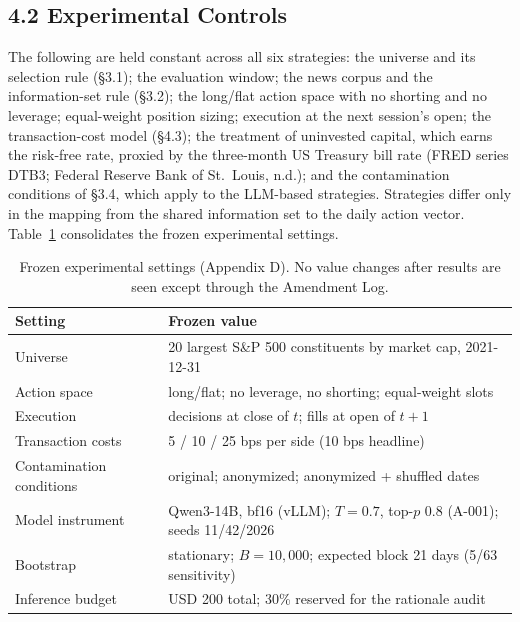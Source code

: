 \documentclass[
  12pt,
]{article}
\begin{document}
\hypertarget{experimental-controls}{%
\subsection{4.2 Experimental Controls}\label{experimental-controls}}

The following are held constant across all six strategies: the universe
and its selection rule (§3.1); the evaluation window; the news corpus
and the information-set rule (§3.2); the long/flat action space with no
shorting and no leverage; equal-weight position sizing; execution at the
next session's open; the transaction-cost model (§4.3); the treatment of
uninvested capital, which earns the risk-free rate, proxied by the
three-month US Treasury bill rate (FRED series DTB3; Federal Reserve
Bank of St.~Louis, n.d.); and the contamination conditions of §3.4,
which apply to the LLM-based strategies. Strategies differ only in the
mapping from the shared information set to the daily action vector. Table~\ref{tab:settings} consolidates the frozen experimental settings.

\begin{table}[H]
\centering\small
\caption{Frozen experimental settings (Appendix D). No value changes after
results are seen except through the Amendment Log.}
\label{tab:settings}
\begin{tabular}{ll}
\toprule
Setting & Frozen value \\
\midrule
Universe & 20 largest S\&P 500 constituents by market cap, 2021-12-31 \\
Action space & long/flat; no leverage, no shorting; equal-weight slots \\
Execution & decisions at close of $t$; fills at open of $t{+}1$ \\
Transaction costs & 5 / 10 / 25 bps per side (10 bps headline) \\
Contamination conditions & original; anonymized; anonymized + shuffled dates \\
Model instrument & Qwen3-14B, bf16 (vLLM); $T{=}0.7$, top-$p$ 0.8 (A-001); seeds 11/42/2026 \\
Bootstrap & stationary; $B{=}10{,}000$; expected block 21 days (5/63 sensitivity) \\
Inference budget & USD 200 total; 30\% reserved for the rationale audit \\
\bottomrule
\end{tabular}
\end{table}
\end{document}
